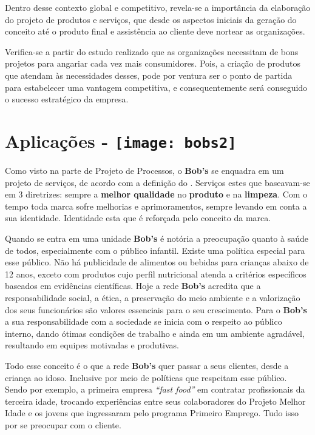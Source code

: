             Dentro desse contexto global e competitivo, revela-se a importância da elaboração do projeto de produtos e serviços, que desde os aspectos iniciais da geração do conceito até o produto final e assistência ao cliente deve nortear as organizações. 


    	Verifica-se a partir do estudo realizado que as organizações necessitam de bons projetos para angariar cada vez mais consumidores. Pois, a criação de produtos que atendam às necessidades desses, pode por ventura ser o ponto de partida para estabelecer uma vantagem competitiva, e consequentemente será conseguido o sucesso estratégico da empresa.

	\section[Aplicações]{Aplicações - \texttt{[image: bobs2]}}
	\label{sec:produtos_aplicacoes}

		Como visto na parte de Projeto de Processos, o \textbf{Bob’s} se enquadra em um projeto de serviços, de acordo com a definição do \cite{slack}. Serviços estes que baseavam-se em 3 diretrizes: sempre a \textbf{melhor qualidade} no \textbf{produto} e na \textbf{limpeza}. Com o tempo toda marca sofre melhorias e aprimoramentos, sempre levando em conta a sua identidade. Identidade esta que é reforçada pelo conceito da marca. 

		Quando se entra em uma unidade \textbf{Bob’s} é notória a preocupação quanto à saúde de todos, especialmente com o público infantil. Existe uma política especial para esse público. Não há publicidade de alimentos ou bebidas para crianças abaixo de 12 anos, exceto com produtos cujo perfil nutricional atenda a critérios específicos baseados em evidências científicas. Hoje a rede \textbf{Bob’s} acredita que a responsabilidade social, a ética, a preservação do meio ambiente e a valorização dos seus funcionários são valores essenciais para o seu crescimento. Para o \textbf{Bob’s} a sua responsabilidade com a sociedade se inicia com o respeito ao público interno, dando ótimas condições de trabalho e ainda em um ambiente agradável, resultando em equipes motivadas e produtivas.

		Todo esse conceito é o que a rede \textbf{Bob’s} quer passar a seus clientes, desde a criança ao idoso. Inclusive por meio de políticas que respeitam esse público. Sendo por exemplo, a primeira empresa \emph{“fast food”} em contratar profissionais da terceira idade, trocando experiências entre seus colaboradores do Projeto Melhor Idade e os jovens que ingressaram pelo programa Primeiro Emprego. Tudo isso por se preocupar com o cliente.

